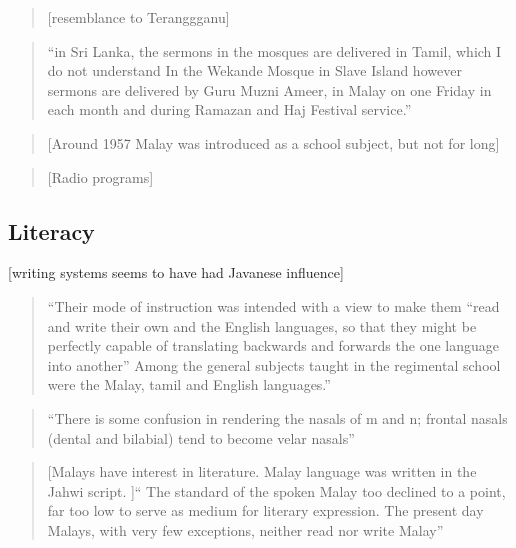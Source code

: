 \begin{quote}
    [resemblance to Teranggganu]\citet[108]{Saldin2003}
\end{quote}

\begin{quote}
    ``\el in Sri Lanka, the sermons in the mosques are delivered in Tamil, which I do not understand \el In the Wekande Mosque in Slave Island however sermons are delivered by Guru Muzni Ameer, in Malay on one Friday in each month and during Ramazan and Haj Festival service.'' \citet[113]{Saldin2003}
\end{quote}

\begin{quote}
    [Around 1957 Malay was introduced as a school subject, but not for long]
\end{quote}\citet[118]{Saldin2003}

\begin{quote}
    [Radio programs]\citet[119]{Saldin2003}
\end{quote}


\subsection{Literacy}\label{sec:slmbg:Literacy}
[writing systems seems to have had Javanese influence]

\begin{quote}
    ``Their mode of instruction was intended with a view to make them ``read and write their own and the English languages, so that they might be perfectly capable of translating backwards and forwards the one language into another'' Among the general subjects taught in the regimental school were the Malay, tamil and English languages.''\citep[96]{Hussainmiya1990}
\end{quote}

\begin{quote}
    ``There is some confusion in rendering the nasals of m and n; frontal nasals (dental and bilabial) tend to become velar nasals''\citep[120]{Hussainmiya1987}
\end{quote}

\begin{quote}
    [Malays have interest in literature. Malay language was written in the Jahwi script. ]`` The standard of the spoken Malay too declined to  a point, far  too low to serve as medium for literary expression. The \el present day Malays, with very few exceptions, neither read nor write Malay''\citep[134]{Hussainmiya1990}
\end{quote}

